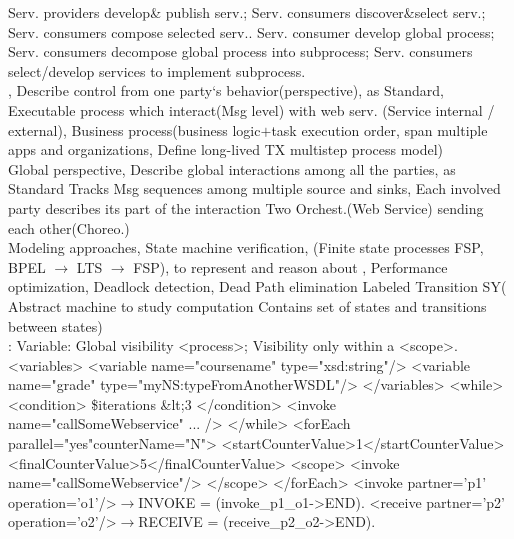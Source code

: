 Serv. providers develop\& publish serv.;
Serv. consumers discover\&select serv.;
Serv. consumers compose selected serv..
Serv. consumer develop global process;
Serv. consumers decompose global process into subprocess;
Serv. consumers select/develop services to implement subprocess.
\\
,
Describe control from one party‘s behavior(perspective),
 as Standard,
Executable process which interact(Msg level) with web serv.
(Service internal / external),
Business process(business logic$+$task execution order,
span multiple apps and organizations,
Define long-lived TX multistep process model)
\\
Global perspective,
Describe global interactions among all the parties,
 as Standard
Tracks Msg sequences among multiple source and sinks,
Each involved party describes its part of the interaction
Two Orchest.(Web Service) sending each other(Choreo.)
\\
Modeling approaches, State machine verification,
(Finite state processes FSP, BPEL $\rightarrow$ LTS $\rightarrow$ FSP),
to represent and reason about ,
Performance optimization,
Deadlock detection, 
Dead Path elimination
Labeled Transition SY(
Abstract machine to study computation
Contains set of states and transitions between states)
\\
:
Variable:
Global visibility <process>;
Visibility only within a <scope>.
<variables>
<variable name="coursename" type="xsd:string"/>
<variable name="grade" type="myNS:typeFromAnotherWSDL"/>
</variables>
<while>
<condition>
\$iterations \&lt;3
</condition>
<invoke name="callSomeWebservice" ... />
</while>
<forEach parallel="yes"counterName="N">
<startCounterValue>1</startCounterValue>
<finalCounterValue>5</finalCounterValue>
<scope>
<invoke name="callSomeWebservice"/>
</scope>
</forEach>
<invoke partner='p1' operation='o1'/>$\rightarrow$INVOKE = (invoke\_p1\_o1->END).
<receive partner='p2' operation='o2'/>$\rightarrow$RECEIVE = (receive\_p2\_o2->END).
